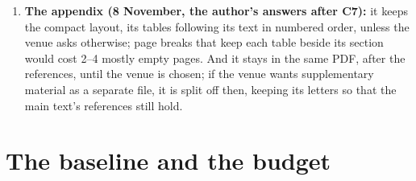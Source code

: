 \documentclass[11pt,a4paper]{article}
\begin{document}
\begin{enumerate}[label=V\arabic*]
        the data section, the introduction and the abstract), moving details to the appendix and
        keeping every number and caveat. Only if that is not enough does C8 shorten the code
        statement to a pointer to the reproducibility appendix; the AI statement stays as it is.
        Whether the chosen venue counts the end statements towards its limit is checked once the
        venue is known.
  \item \textbf{The appendix (8 November, the author's answers after C7):} it keeps the compact
        layout, its tables following its text in numbered order, unless the venue asks otherwise;
        page breaks that keep each table beside its section would cost 2--4 mostly empty pages.
        And it stays in the same PDF, after the references, until the venue is chosen; if the
        venue wants supplementary material as a separate file, it is split off then, keeping its
        letters so that the main text's references still hold.
\end{enumerate}

\section{The baseline and the budget}
\end{document}
